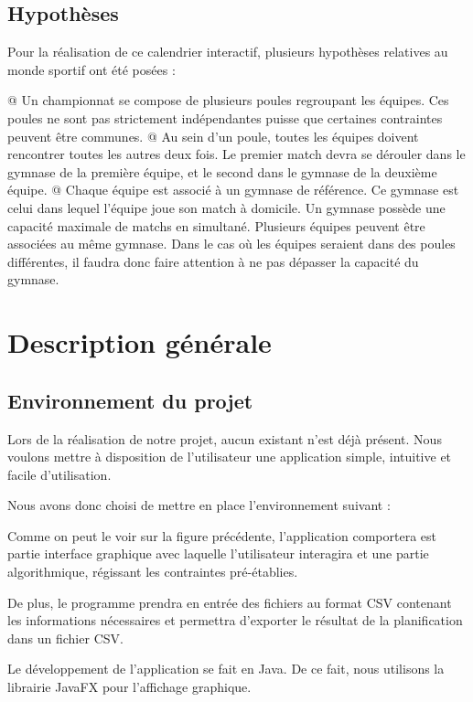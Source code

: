 \documentclass[final, noposter]{polytech/polytech}
\begin{document}
	\section{Hypothèses}
		Pour la réalisation de ce calendrier interactif, plusieurs hypothèses relatives au monde sportif ont été posées :
		\begin{easylist}[itemize]
			@ Un championnat se compose de plusieurs poules regroupant les équipes. Ces poules ne sont pas strictement indépendantes puisse que certaines contraintes peuvent être communes.
			@ Au sein d'un poule, toutes les équipes doivent rencontrer toutes les autres deux fois. Le premier match devra se dérouler dans le gymnase de la première équipe, et le second dans le gymnase de la deuxième équipe.
			@ Chaque équipe est associé à un gymnase de référence. Ce gymnase est celui dans lequel l'équipe joue son match à domicile. Un gymnase possède une capacité maximale de matchs en simultané. Plusieurs équipes peuvent être associées au même gymnase. Dans le cas où les équipes seraient dans des poules différentes, il faudra donc faire attention à ne pas dépasser la capacité du gymnase.
		\end{easylist}

\chapter{Description générale}	
	\section{Environnement du projet}
		Lors de la réalisation de notre projet, aucun existant n’est déjà présent. Nous voulons mettre à disposition de l’utilisateur une application simple, intuitive et facile d'utilisation.
		
		Nous avons donc choisi de mettre en place l’environnement suivant :

		Comme on peut le voir sur la figure précédente, l'application comportera est partie interface graphique avec laquelle l'utilisateur interagira et une partie algorithmique, régissant les contraintes pré-établies.
		
		De plus, le programme prendra en entrée des fichiers au format CSV contenant les informations nécessaires et permettra d'exporter le résultat de la planification dans un fichier CSV.

		Le développement de l'application se fait en Java. De ce fait, nous utilisons la librairie JavaFX pour l'affichage graphique.
		
\end{document}
